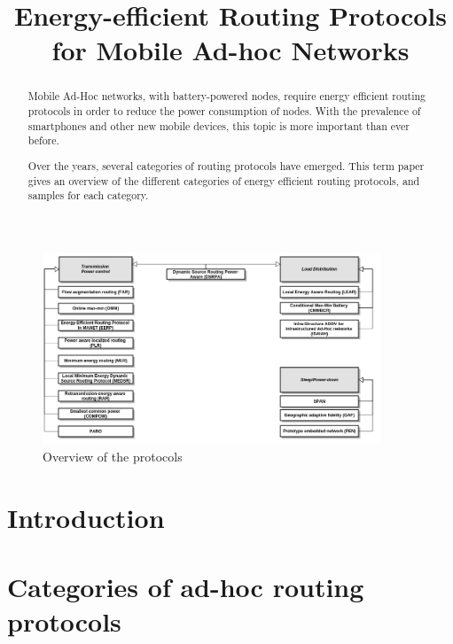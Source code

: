 \documentclass[conference]{IEEEtran}
\begin{document}
\title{Energy-efficient Routing Protocols for Mobile Ad-hoc Networks}
\author{
}

\maketitle



\begin{abstract}
Mobile Ad-Hoc networks, with battery-powered nodes, require energy efficient
routing protocols in order to reduce the power consumption of nodes. With the
prevalence of smartphones and other new mobile devices, this topic is more
important than ever before.

Over the years, several categories of routing protocols have emerged.
This term paper gives an overview of the different categories of energy
efficient routing protocols, and samples for each category.
\end{abstract}
\begin{figure}
  \centering
  \includegraphics[width=0.9\textwidth]{images/overview}
  \caption{Overview of the protocols}
  \label{fig:overview}
\end{figure}

\section{Introduction}


\section{Categories of ad-hoc routing protocols}\label{categories}

\end{document}
